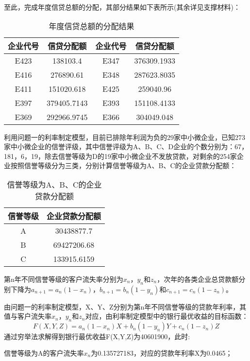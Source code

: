 \documentclass{cumcmthesis}
\begin{document}
至此，完成年度信贷总额的分配，其部分结果如下表所示(其余详见支撑材料)：
\begin{table}[H]   %
	\caption{年度信贷总额的分配结果}\label{tab:27} \centering
	\begin{tabular}{cccc}
		\toprule[1.5pt]
企业代号 & 信贷分配额 & 企业代号 & 信贷分配额\\
		\midrule[1pt]
E423 & 138103.4 &  E347 & 376309.1933 \\
E416 & 276890.61 & E348 & 287623.8035  \\
E411 & 151020.618 & E425 & 259040.96 \\
E397 & 379405.7143 & E393 & 151108.4133\\
E369 & 292966.9745 & E366 & 304049.048 \\
\bottomrule[1.5pt]
\end{tabular}
\end{table}

利用问题一的利率制定模型，目前已排除年利润为负的29家中小微企业，已知273家中小微企业的信誉评级，其中信誉评级为A、B、C、D企业的个数分别为：67，181，6，19，除去信誉等级为D的19家中小微企业不发放贷款，对剩余的254家企业按照信誉等级分为三类，分别计算信誉等级为A、B、C的企业贷款分配额：
\begin{table}[H]   %
	\caption{信誉等级为A、B、C的企业贷款分配额}\label{tab:30} \centering
	\begin{tabular}{cc}
		\toprule[1.5pt]
		信誉等级 & 企业贷款分配额  \\
		\midrule[1pt]
		A    & 30438877.7 \\
		B    & 69427206.68 \\
		C    & 133915.6159 \\
		\bottomrule[1.5pt]
	\end{tabular}
\end{table}

第n年不同信誉等级的客户流失率分别为$x_n$，$y_n$和$z_n$，次年的各类企业总贷款额分别下降为$a_{n+1}=a_n(1-x_n)$，$b_{n+1}=b_n(1-y_n)$和$c_{n+1}=c_n(1-z_n)$。

由问题一的利率制定模型，X、Y、Z分别为第n年不同信誉等级的贷款年利率，其值与客户流失率$x_n$，$y_n$和$z_n$对应，由利率制定模型中的银行最优收益的目标函数：
\begin{equation}
F(X,Y,Z)=a_n(1-x_n)X+b_n(1-y_n)Y+c_n(1-z_n)Z
\end{equation}
通过穷举法求解得到银行最优收益F(X,Y,Z)为40601900，此时:

信誉等级为A的客户流失率$x_n$为0.135727183，对应的贷款年利率X为0.0465；
\end{document}
